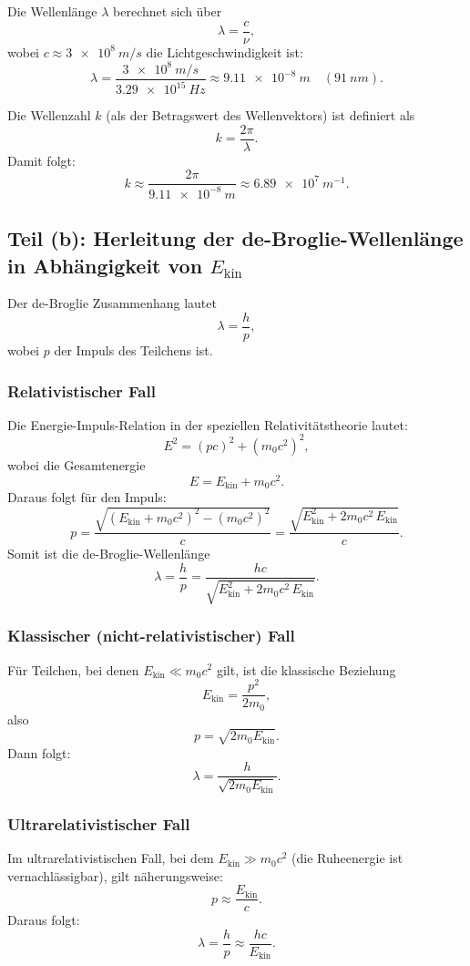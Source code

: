 \documentclass[12pt]{article}
\begin{document}
Die Wellenlänge \(\lambda\) berechnet sich über
\[
\lambda = \frac{c}{\nu},
\]
wobei \(c \approx \SI{3e8}{m/s}\) die Lichtgeschwindigkeit ist:
\[
\lambda = \frac{\SI{3e8}{m/s}}{\SI{3.29e15}{Hz}} \approx \SI{9.11e-8}{m} \quad (\SI{91}{nm}).
\]

Die Wellenzahl \(k\) (als der Betragswert des Wellenvektors) ist definiert als
\[
k = \frac{2\pi}{\lambda}.
\]
Damit folgt:
\[
k \approx \frac{2\pi}{\SI{9.11e-8}{m}} \approx \SI{6.89e7}{m^{-1}}.
\]

\subsection*{Teil (b): Herleitung der de-Broglie-Wellenlänge in Abhängigkeit von \(E_{\mathrm{kin}}\)}

Der de-Broglie Zusammenhang lautet
\[
\lambda = \frac{h}{p},
\]
wobei \(p\) der Impuls des Teilchens ist.

\subsubsection*{Relativistischer Fall}

Die Energie-Impuls-Relation in der speziellen Relativitätstheorie lautet:
\[
E^2 = (pc)^2 + (m_0 c^2)^2,
\]
wobei die Gesamtenergie
\[
E = E_{\mathrm{kin}} + m_0 c^2.
\]
Daraus folgt für den Impuls:
\[
p = \frac{\sqrt{(E_{\mathrm{kin}}+m_0 c^2)^2 - (m_0 c^2)^2}}{c} = \frac{\sqrt{E_{\mathrm{kin}}^2 + 2 m_0 c^2\, E_{\mathrm{kin}}}}{c}.
\]
Somit ist die de-Broglie-Wellenlänge
\[
\lambda = \frac{h}{p} = \frac{h c}{\sqrt{E_{\mathrm{kin}}^2 + 2 m_0 c^2\, E_{\mathrm{kin}}}}.
\]

\subsubsection*{Klassischer (nicht-relativistischer) Fall}

Für Teilchen, bei denen \(E_{\mathrm{kin}} \ll m_0 c^2\) gilt, ist die klassische Beziehung
\[
E_{\mathrm{kin}} = \frac{p^2}{2m_0},
\]
also
\[
p = \sqrt{2 m_0 E_{\mathrm{kin}}}.
\]
Dann folgt:
\[
\lambda = \frac{h}{\sqrt{2 m_0 E_{\mathrm{kin}}}}.
\]

\subsubsection*{Ultrarelativistischer Fall}

Im ultrarelativistischen Fall, bei dem \(E_{\mathrm{kin}} \gg m_0 c^2\) (die Ruheenergie ist vernachlässigbar), gilt näherungsweise:
\[
p \approx \frac{E_{\mathrm{kin}}}{c}.
\]
Daraus folgt:
\[
\lambda = \frac{h}{p} \approx \frac{h c}{E_{\mathrm{kin}}}.
\]
\end{document}
